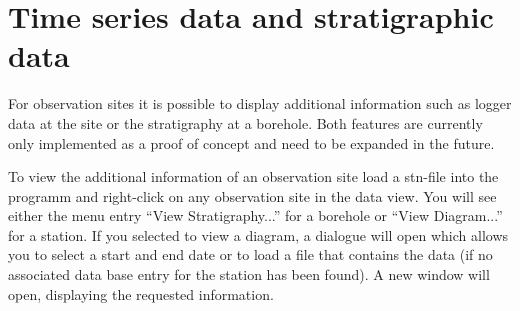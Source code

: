\section{Time series data and stratigraphic data}

For observation sites it is possible to display additional information such as logger data at the site or the stratigraphy at a borehole. Both features are currently only implemented as a proof of concept and need to be expanded in the future.

To view the additional information of an observation site load a stn-file into the programm and right-click on any observation site in the data view. You will see either the menu entry ``View Stratigraphy...'' for a borehole or ``View Diagram...'' for a station. If you selected to view a diagram, a dialogue will open which allows you to select a start and end date or to load a file that contains the data (if no associated data base entry for the station has been found). A new window will open, displaying the requested information.


